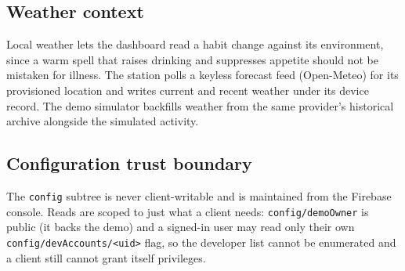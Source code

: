 \subsection{Weather context}

Local weather lets the dashboard read a habit change against its environment, since a warm spell that
raises drinking and suppresses appetite should not be mistaken for illness. The station polls a keyless
forecast feed (Open-Meteo) for its provisioned location and writes current and recent weather under its
device record. The demo simulator backfills weather from the same provider's historical archive
alongside the simulated activity.

\subsection{Configuration trust boundary}

The \texttt{config} subtree is never client-writable and is maintained from the Firebase console.
Reads are scoped to just what a client needs: \texttt{config/demoOwner} is public (it backs the demo)
and a signed-in user may read only their own \texttt{config/devAccounts/<uid>} flag, so the developer
list cannot be enumerated and a client still cannot grant itself privileges.

